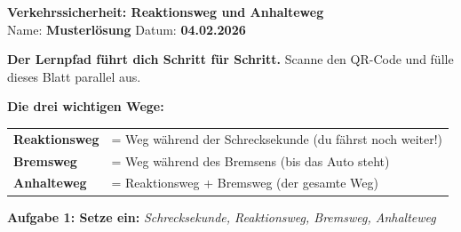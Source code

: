 \documentclass[11pt,a4paper]{article}
\newcommand{\aufgabe}[1]{\textbf{\textcolor{physik}{#1}}}
\newcommand{\lsg}[1]{\textcolor{loesung}{\textbf{#1}}}
\begin{document}
\noindent
\begin{minipage}[t]{0.80\textwidth}
    \vspace{0pt}
    {\Large\bfseries Verkehrssicherheit: Reaktionsweg und Anhalteweg}\\[0.3em]
    Name: \lsg{Musterlösung} \hfill Datum: \lsg{04.02.2026}
\end{minipage}
\hfill
\begin{minipage}[t]{0.16\textwidth}
    \vspace{0pt}
    \raggedleft
    \href{https://devbox42.github.io/sciencesim/physik/kl06/02-bewegung/std-04-verkehrssicherheit/LP-04-verkehrssicherheit.html}{%
    }
\end{minipage}

\vspace{0.2em}
\begin{hinweisbox}
\centering
\textbf{Der Lernpfad führt dich Schritt für Schritt.} Scanne den QR-Code und fülle dieses Blatt parallel aus.
\end{hinweisbox}

\vspace{0.4em}

\begin{merkbox}
\textbf{Die drei wichtigen Wege:}
\hfill
\renewcommand{\arraystretch}{1.3}
\begin{tabular}{ll}
\textbf{Reaktionsweg} & = Weg während der Schrecksekunde (du fährst noch weiter!) \\
\textbf{Bremsweg} & = Weg während des Bremsens (bis das Auto steht) \\
\textbf{Anhalteweg} & = Reaktionsweg + Bremsweg (der gesamte Weg) \\
\end{tabular}
\end{merkbox}

\vspace{0.4em}

\aufgabe{Aufgabe 1: Setze ein:} \textit{Schrecksekunde, Reaktionsweg, Bremsweg, Anhalteweg}
\end{document}
